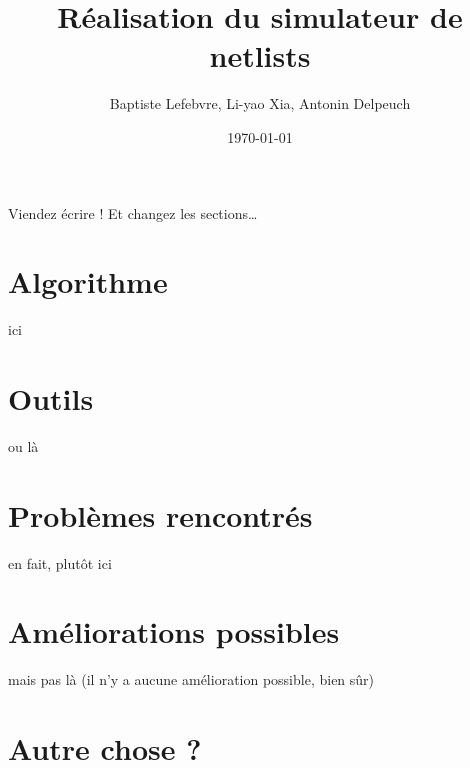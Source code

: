 \documentclass[a4paper]{article}
\begin{document}
\title{Réalisation du simulateur de netlists}
\author{Baptiste Lefebvre, Li-yao Xia, Antonin Delpeuch}
\date{\today}

\maketitle

Viendez écrire !
Et changez les sections…

\section{Algorithme}

ici

\section{Outils}

ou là

\section{Problèmes rencontrés}

en fait, plutôt ici

\section{Améliorations possibles}

mais pas là (il n'y a aucune amélioration possible, bien sûr)

\section{Autre chose ?}
\end{document}
